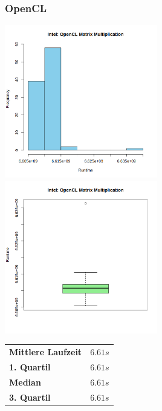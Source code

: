 \documentclass[12pt]{article}
\begin{document}
	\subsubsection*{OpenCL}
	\includegraphics[width=0.5\textwidth]{../statistics/intel/opencl/histogram_matmul.png}
	\includegraphics[width=0.5\textwidth]{../statistics/intel/opencl/boxplot_matmul.png}
	\\
	\begin{center}
		\begin{tabular}{|l|l|}
			\toprule
			\textbf{Mittlere Laufzeit} 		& $6.61s$ \\
			\textbf{1. Quartil}				& $6.61s$ \\
			\textbf{Median}					& $6.61s$  \\
			\textbf{3. Quartil}				& $6.61s$  \\
			\bottomrule
		\end{tabular}
	\end{center}
	
\end{document}
